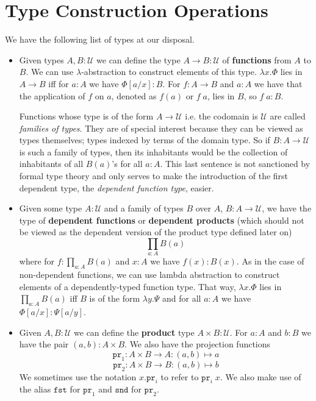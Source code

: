 \documentclass[12pt]{report}
\theoremstyle{definition}
\begin{document}
\section{Type Construction Operations}\label{informalTT}
We have the following list of types at our disposal.
\begin{itemize}
	\item Given types $A, B : \mathcal{U}$ we can define the type $A \rightarrow B : \mathcal{U}$ of \textbf{functions} from $A$ to $B$. 
		We can use $\lambda$-abstraction to construct elements of this type. $\lambda x. \Phi$ lies in $A \rightarrow B$ iff for $a : A$ we have $\Phi[a/x] : B$. 
		For $f : A \rightarrow B$ and $a : A$ we have that the application of $f$ on $a$, denoted as $f(a)$ or $f\;a$, lies in $B$, so $f\;a : B$. 

		Functions whose type is of the form $A \rightarrow \mathcal{U}$ i.e. the codomain is $\mathcal{U}$ are called \textit{families of types}. 
		They are of special interest because they can be viewed as types themselves; types indexed by terms of the domain type. 
		So if $B : A \rightarrow \mathcal{U}$ is such a family of types, then its inhabitants would be the collection of inhabitants of all $B(a)$'s for all $a  : A$. 
		This last sentence is not sanctioned by formal type theory and only serves to make the introduction of the first dependent type, the \textit{dependent function type}, easier.
	\item Given some type $A : \mathcal{U}$ and a family of types $B$ over $A$, $B : A \rightarrow \mathcal{U}$, we have the type of \textbf{dependent functions} or \textbf{dependent products} (which should not be viewed as the dependent version of the product type defined later on) $$\prod_{a : A} B(a)$$
	where for $f : \prod_{a : A} B(a)$ and $x : A$ we have $f(x) : B(x)$. 
	As in the case of non-dependent functions, we can use lambda abstraction to construct elements of a dependently-typed function type. 
	That way, $\lambda x.\Phi$ lies in $\prod_{a:A}B(a)$ iff $B$ is of the form $\lambda y.\Psi$ and for all $a:A$ we have $\Phi[a/x] : \Psi[a/y]$. 
	\item Given $A, B : \mathcal{U}$ we can define the \textbf{product} type $A \times B : \mathcal{U}$. 
	For $a : A$ and $b : B$ we have the pair $(a,b) : A \times B$. 
	We also have the projection functions 
	$$\mathtt{pr}_1 : A \times B \rightarrow A : (a,b) \mapsto a$$
	$$\mathtt{pr}_2 : A \times B \rightarrow B : (a,b) \mapsto b$$
	We sometimes use the notation $x.\mathtt{pr}_i$ to refer to $\mathtt{pr}_i\; x$. 
	We also make use of the alias $\mathtt{fst}$ for $\mathtt{pr}_1$ and $\mathtt{snd}$ for $\mathtt{pr}_2$. 


\end{itemize}
\end{document}
